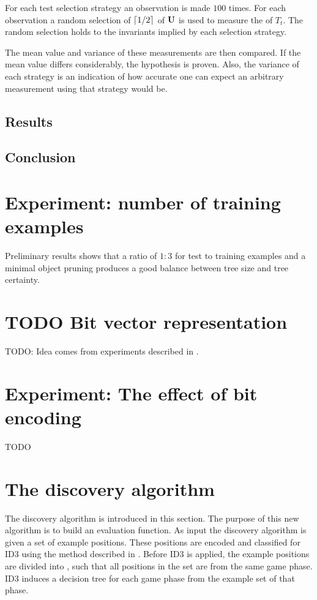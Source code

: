 For each test selection strategy an observation is made $100$ times.  For each observation a random selection of $\lceil1/2\rceil$ of ${\bf U}$ is used to measure the  of $T_t$.  The random selection holds to the invariants implied by each selection strategy. 

The mean value and variance of these measurements are then compared.   If the mean value differs considerably, the hypothesis is proven.  Also, the variance of each strategy is an indication of how accurate one can expect an arbitrary measurement using that strategy would be.  

      
\subsection{Results}
\subsection{Conclusion}
\section{Experiment: number of training examples}
Preliminary results shows that a ratio of $1:3$ for test to training examples and a minimal object pruning produces a good balance between tree size and tree certainty.

\section{TODO Bit vector representation}
TODO: Idea comes from experiments described in \cite{shavlik:comparision}.  
\section{Experiment: The effect of bit encoding}
TODO

\section{The discovery algorithm}
\label{sec:discovery_algorithm}
The discovery algorithm is introduced in this section.  The purpose of this new algorithm is to build an evaluation function. As input the discovery algorithm is given a set of example positions. These positions are encoded and classified for ID3 using the method described in .
Before ID3 is applied, the example positions are divided into , such that all positions in the set are from the same game phase.  ID3 induces a decision tree for each game phase from the example set of that phase.   

